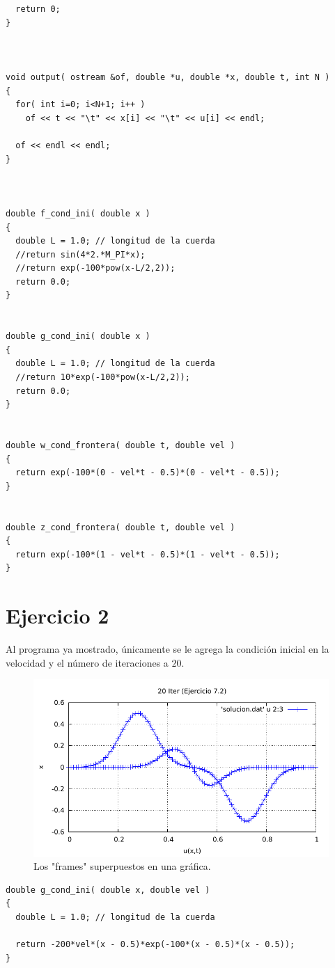 \begin{lstlisting}
  return 0;
}



void output( ostream &of, double *u, double *x, double t, int N )
{
  for( int i=0; i<N+1; i++ )
    of << t << "\t" << x[i] << "\t" << u[i] << endl;

  of << endl << endl;
}



double f_cond_ini( double x )
{
  double L = 1.0; // longitud de la cuerda
  //return sin(4*2.*M_PI*x);
  //return exp(-100*pow(x-L/2,2));
  return 0.0;
}


double g_cond_ini( double x )
{
  double L = 1.0; // longitud de la cuerda
  //return 10*exp(-100*pow(x-L/2,2));
  return 0.0;
}


double w_cond_frontera( double t, double vel )
{
  return exp(-100*(0 - vel*t - 0.5)*(0 - vel*t - 0.5));
}


double z_cond_frontera( double t, double vel )
{
  return exp(-100*(1 - vel*t - 0.5)*(1 - vel*t - 0.5));
}
\end{lstlisting}

\section*{Ejercicio 2}
Al programa ya mostrado, únicamente se le agrega la condición inicial en la velocidad y el número de iteraciones a $20$. 

\begin{figure}[H]
	\centering
	\includegraphics[scale=1]{../img/ej7-2.pdf}
	\caption{Los "frames" superpuestos en una gráfica.}
	\label{ej7-2}
\end{figure}


\begin{lstlisting}
double g_cond_ini( double x, double vel )
{
  double L = 1.0; // longitud de la cuerda

  return -200*vel*(x - 0.5)*exp(-100*(x - 0.5)*(x - 0.5));
}
\end{lstlisting}

